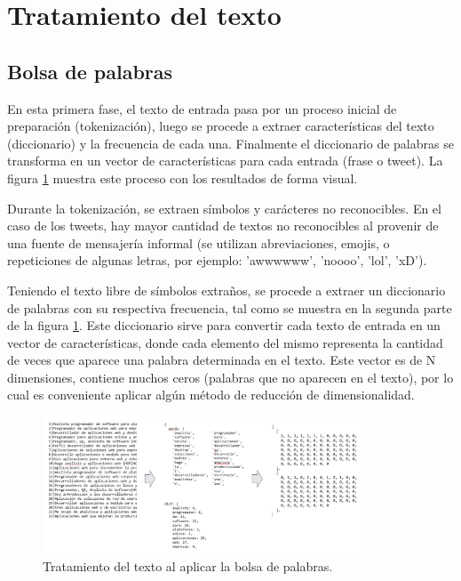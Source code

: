 \section{Tratamiento del texto}

\subsection{Bolsa de palabras}

En esta primera fase, el texto de entrada pasa por un proceso inicial de preparación (tokenización), luego se procede a extraer características del texto (diccionario) y la frecuencia de cada una. Finalmente el diccionario de palabras se transforma en un vector de características para cada entrada (frase o tweet). La figura \ref{fig:bolsa} muestra este proceso con los resultados de forma visual.

Durante la tokenización, se extraen símbolos y carácteres no reconocibles. En el caso de los tweets, hay mayor cantidad de textos no reconocibles al provenir de una fuente de mensajería informal (se utilizan abreviaciones, emojis, o repeticiones de algunas letras, por ejemplo: 'awwwwww', 'noooo', 'lol', 'xD').

Teniendo el texto libre de símbolos extraños, se procede a extraer un diccionario de palabras con su respectiva frecuencia, tal como se muestra en la segunda parte de la figura \ref{fig:bolsa}. Este diccionario sirve para convertir cada texto de entrada en un vector de características, donde cada elemento del mismo representa la cantidad de veces que aparece una palabra determinada en el texto. Este vector es de N dimensiones, contiene muchos ceros (palabras que no aparecen en el texto), por lo cual es conveniente aplicar algún método de reducción de dimensionalidad.

\begin{figure}[h!]
	\begin{center}
	\includegraphics[angle=0,width=9.5cm]{Graficos/bolsa_palabras}
	\caption{Tratamiento del texto al aplicar la bolsa de palabras.}
	\label{fig:bolsa}
  \end{center}
\end{figure}

